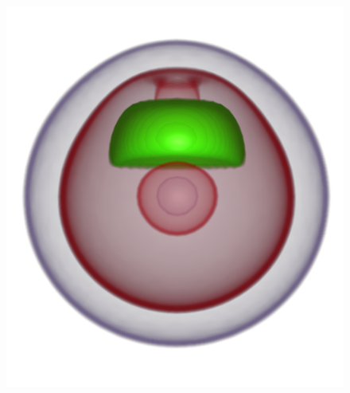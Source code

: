 \begin{figure}
	\centering
	\begin{minipage}{.24\textwidth}
		\includegraphics[width=1\linewidth]{figures/nucleon_naive_proportional_optimized_linesearch}
		\subcaption{}
	\end{minipage}~
	\begin{minipage}{.15\textwidth}

\end{minipage}
\end{figure}
